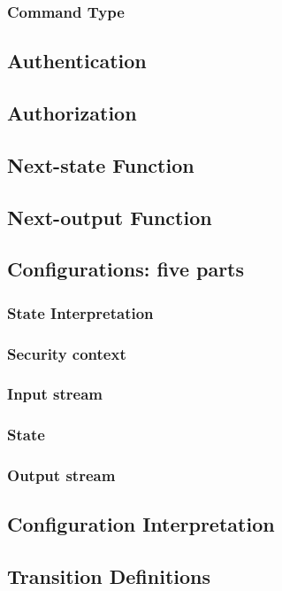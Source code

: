 \documentclass[../../main/main.tex]{subfiles}
\begin{document}
\subsubsection{Command Type}
\subsection{Authentication}
\subsection{Authorization}
\subsection{Next-state Function}
\subsection{Next-output Function}

\subsection{Configurations: five parts}

\subsubsection{State Interpretation}
\subsubsection{Security context}
\subsubsection{Input stream}
\subsubsection{State}
\subsubsection{Output stream}
\subsection{Configuration Interpretation}

\subsection{Transition Definitions}
\end{document}
